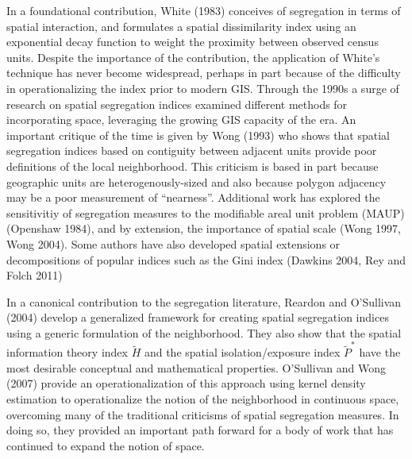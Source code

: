 \documentclass[
  10pt,
]{article}
\begin{document}
In a foundational contribution, White (1983) conceives of segregation in
terms of spatial interaction, and formulates a spatial dissimilarity
index using an exponential decay function to weight the proximity
between observed census units. Despite the importance of the
contribution, the application of White's technique has never become
widespread, perhaps in part because of the difficulty in
operationalizing the index prior to modern GIS. Through the 1990s a
surge of research on spatial segregation indices examined different
methods for incorporating space, leveraging the growing GIS capacity of
the era. An important critique of the time is given by Wong (1993) who
shows that spatial segregation indices based on contiguity between
adjacent units provide poor definitions of the local neighborhood. This
criticism is based in part because geographic units are
heterogenously-sized and also because polygon adjacency may be a poor
measurement of ``nearness''. Additional work has explored the
sensitivitiy of segregation measures to the modifiable areal unit
problem (MAUP) (Openshaw 1984), and by extension, the importance of
spatial scale (Wong 1997, Wong 2004). Some authors have also developed
spatial extensions or decompositions of popular indices such as the Gini
index (Dawkins 2004, Rey and Folch 2011)

In a canonical contribution to the segregation literature, Reardon and
O'Sullivan (2004) develop a generalized framework for creating spatial
segregation indices using a generic formulation of the neighborhood.
They also show that the spatial information theory index \(\tilde{H}\)
and the spatial isolation/exposure index \(\tilde{P}^\ast\) have the
most desirable conceptual and mathematical properties. O'Sullivan and
Wong (2007) provide an operationalization of this approach using kernel
density estimation to operationalize the notion of the neighborhood in
continuous space, overcoming many of the traditional criticisms of
spatial segregation measures. In doing so, they provided an important
path forward for a body of work that has continued to expand the notion
of space.
\end{document}

